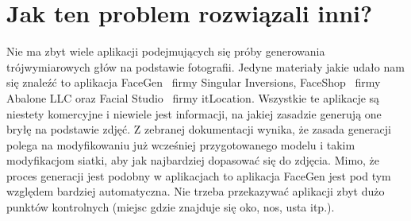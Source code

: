 \section{Jak ten problem rozwiązali inni?}
Nie ma zbyt wiele aplikacji podejmujących się próby generowania trójwymiarowych
głów na podstawie fotografii. Jedyne materiały jakie udało nam się znaleźć to
aplikacja FaceGen~\cite{link04} firmy Singular Inversions,
FaceShop~\cite{link05} firmy Abalone LLC oraz Facial Studio~\cite{facialstudio}
firmy itLocation. Wszystkie te aplikacje są niestety komercyjne i niewiele
jest informacji, na jakiej zasadzie generują one bryłę na podstawie zdjęć. Z
zebranej dokumentacji wynika, że zasada generacji polega na modyfikowaniu już
wcześniej przygotowanego modelu i takim modyfikacjom siatki, aby jak najbardziej
dopasować się do zdjęcia. Mimo, że proces generacji jest podobny w aplikacjach
to aplikacja FaceGen jest pod tym względem bardziej automatyczna. Nie trzeba
przekazywać aplikacji zbyt dużo punktów kontrolnych (miejsc gdzie znajduje się
oko, nos, usta itp.).

